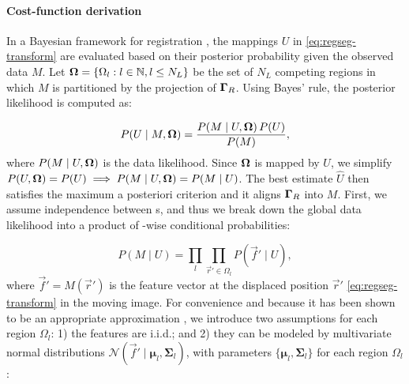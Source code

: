 \paragraph*{Cost-function derivation}
In a Bayesian framework for registration \citep{wyatt_map_2003,pohl_bayesian_2006,gass_simultaneous_2014},
  the mappings $U$ in \eqref{eq:regseg-transform} are
  evaluated based on their posterior probability given the observed data
  $M$.
Let $\boldsymbol{\Omega} = \{\Omega_l: l \in \mathbb{N}, l \leq N_L\}$ be the set of $N_L$ competing regions in
  which $M$ is partitioned by the projection of $\boldsymbol{\Gamma}_R$.
Using Bayes' rule, the posterior likelihood is computed as:

  \begin{equation}
  P(U \mid M, \boldsymbol{\Omega} ) = \frac{P(M \mid U,\boldsymbol{\Omega} )\, P(U)}{P(M)},
  \label{eq:regseg-bayes_rule}
  \end{equation}
  where $P(M \mid U,\boldsymbol{\Omega})$ is the data likelihood.
Since $\boldsymbol{\Omega}$ is mapped by $U$, we simplify
  $P(U, \boldsymbol{\Omega}) = P(U) \implies P(M \mid U,\boldsymbol{\Omega}) = P(M \mid U)$.
The best estimate $\hat{U}$ then satisfies the maximum a posteriori criterion
  and it aligns $\boldsymbol{\Gamma}_R$ into $M$.
First, we assume independence between s, and thus we break down the
  global data likelihood into a product of -wise conditional probabilities:

  \begin{equation}
  P(M \mid U) = \underset{l}{\prod} \underset{\vec{r}'\in \Omega_l}{\prod}
    P\left( \vec{f}' \mid U \right),
  \label{eq:regseg-bayes_aposteriori}
  \end{equation}
  where $\vec{f}' = M(\vec{r}')$ is the feature vector at the displaced
  position $\vec{r}'$ \eqref{eq:regseg-transform} in the moving image.
For convenience and because it has been shown to be an appropriate approximation
  \citep{leemput_automated_1999,cuadra_comparison_2005}, we introduce two assumptions for each
  region $\Omega_l$:
  1) the features are i.i.d.; and 2) they can be modeled by multivariate normal
  distributions 
  $\mathcal{N} (\vec{f}' \mid \boldsymbol{\mu}_l, \boldsymbol{\Sigma}_{l} )$, with parameters
  $\lbrace \boldsymbol{\mu}_l, \boldsymbol{\Sigma}_{l} \rbrace$
  for each region $\Omega_l$ \citep{esteban_mbis_2014}:

